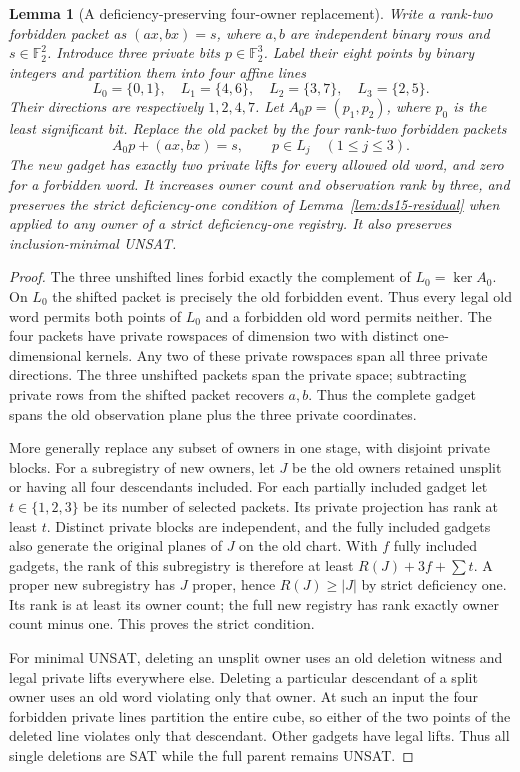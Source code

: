 \documentclass[11pt]{article}
\newtheorem{lemma}[theorem]{Lemma}
\begin{document}
\begin{lemma}[A deficiency-preserving four-owner replacement]\label{lem:rt21-gadget}
Write a rank-two forbidden packet as $(a x,b x)=s$, where $a,b$ are independent binary rows and $s\in\mathbb F_2^2$. Introduce three private bits $p\in\mathbb F_2^3$. Label their eight points by binary integers and partition them into four affine lines
\[
 L_0=\{0,1\},\quad L_1=\{4,6\},\quad
 L_2=\{3,7\},\quad L_3=\{2,5\}.
\]
Their directions are respectively $1,2,4,7$. Let $A_0p=(p_1,p_2)$, where $p_0$ is the least significant bit. Replace the old packet by the four rank-two forbidden packets
\[
 A_0p+(a x,b x)=s,\qquad p\in L_j\quad(1\le j\le3).
\]
The new gadget has exactly two private lifts for every allowed old word, and zero for a forbidden word. It increases owner count and observation rank by three, and preserves the strict deficiency-one condition of Lemma~\ref{lem:ds15-residual} when applied to any owner of a strict deficiency-one registry. It also preserves inclusion-minimal UNSAT.
\end{lemma}
\begin{proof}
The three unshifted lines forbid exactly the complement of $L_0=\ker A_0$. On $L_0$ the shifted packet is precisely the old forbidden event. Thus every legal old word permits both points of $L_0$ and a forbidden old word permits neither. The four packets have private rowspaces of dimension two with distinct one-dimensional kernels. Any two of these private rowspaces span all three private directions. The three unshifted packets span the private space; subtracting private rows from the shifted packet recovers $a,b$. Thus the complete gadget spans the old observation plane plus the three private coordinates.

More generally replace any subset of owners in one stage, with disjoint private blocks. For a subregistry of new owners, let $J$ be the old owners retained unsplit or having all four descendants included. For each partially included gadget let $t\in\{1,2,3\}$ be its number of selected packets. Its private projection has rank at least $t$. Distinct private blocks are independent, and the fully included gadgets also generate the original planes of $J$ on the old chart. With $f$ fully included gadgets, the rank of this subregistry is therefore at least $R(J)+3f+\sum t$. A proper new subregistry has $J$ proper, hence $R(J)\ge |J|$ by strict deficiency one. Its rank is at least its owner count; the full new registry has rank exactly owner count minus one. This proves the strict condition.

For minimal UNSAT, deleting an unsplit owner uses an old deletion witness and legal private lifts everywhere else. Deleting a particular descendant of a split owner uses an old word violating only that owner. At such an input the four forbidden private lines partition the entire cube, so either of the two points of the deleted line violates only that descendant. Other gadgets have legal lifts. Thus all single deletions are SAT while the full parent remains UNSAT.
\end{proof}
\end{document}
